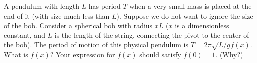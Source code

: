 A pendulum with length $L$ has period $T$ when a very small mass is
placed at the end of it (with size much less than $L$). Suppose we do
not want to ignore the size of the bob. Consider a spherical bob with
radius $xL$ ($x$ is a dimensionless constant, and $L$ is the length
of the string, connecting the pivot to the center of the bob). The
period of motion of this physical pendulum is $T = 2\pi\sqrt{L/g}
f(x)$. What is $f(x)$? Your expression for $f(x)$ should satisfy
$f(0) = 1$. (Why?)\answercheck
